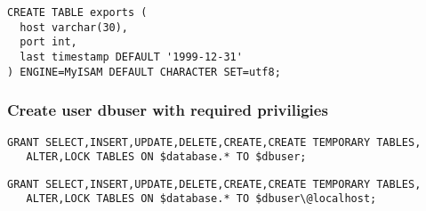 \begin{verbatim}
CREATE TABLE exports (
  host varchar(30),
  port int,
  last timestamp DEFAULT '1999-12-31'
) ENGINE=MyISAM DEFAULT CHARACTER SET=utf8;
\end{verbatim}

\subsubsection{Create user dbuser with required priviligies}
\begin{verbatim}
GRANT SELECT,INSERT,UPDATE,DELETE,CREATE,CREATE TEMPORARY TABLES,
   ALTER,LOCK TABLES ON $database.* TO $dbuser;
\end{verbatim}

\begin{verbatim}
GRANT SELECT,INSERT,UPDATE,DELETE,CREATE,CREATE TEMPORARY TABLES,
   ALTER,LOCK TABLES ON $database.* TO $dbuser\@localhost;
\end{verbatim}

